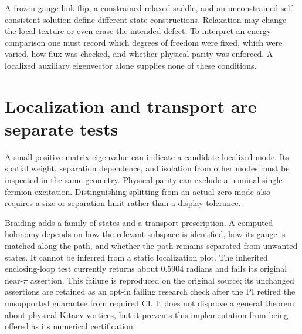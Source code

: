 A frozen gauge-link flip, a constrained relaxed saddle, and an unconstrained
self-consistent solution define different state constructions. Relaxation may
change the local texture or even erase the intended defect. To interpret an
energy comparison one must record which degrees of freedom were fixed, which
were varied, how flux was checked, and whether physical parity was enforced.
A localized auxiliary eigenvector alone supplies none of these conditions.

\section{Localization and transport are separate tests}
A small positive matrix eigenvalue can indicate a candidate localized mode.
Its spatial weight, separation dependence, and isolation from other modes must
be inspected in the same geometry. Physical parity can exclude a nominal
single-fermion excitation. Distinguishing splitting from an actual zero mode
also requires a size or separation limit rather than a display tolerance.

Braiding adds a family of states and a transport prescription. A computed
holonomy depends on how the relevant subspace is identified, how its gauge is
matched along the path, and whether the path remains separated from unwanted
states. It cannot be inferred from a static localization plot. The inherited
enclosing-loop test currently returns about $0.5904$ radians and fails its
original near-$\pi$ assertion. This failure is reproduced on the original
source; its unchanged assertions are retained as an opt-in failing research check after
the PI retired the unsupported guarantee from required CI. It does
not disprove a general theorem about physical Kitaev vortices, but it prevents
this implementation from being offered as its numerical certification.
